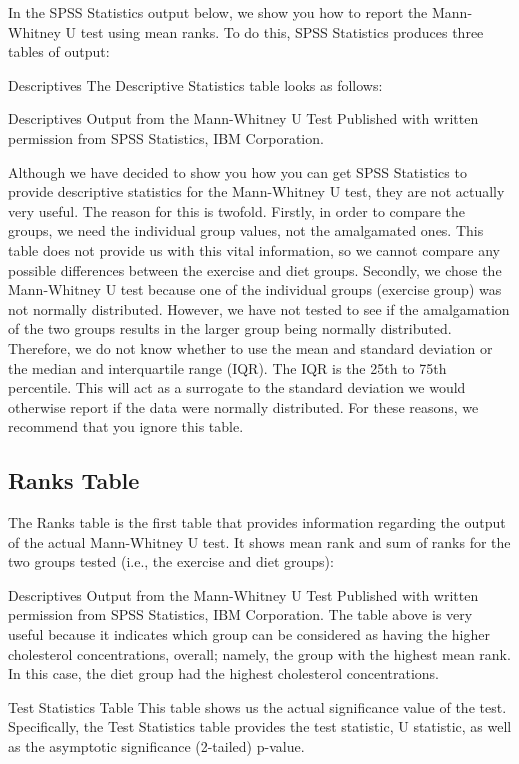 \documentclass[]{article}
\begin{document}
In the SPSS Statistics output below, we show you how to report the Mann-Whitney U test using mean ranks. To do this, SPSS Statistics produces three tables of output:

Descriptives
The Descriptive Statistics table looks as follows:

Descriptives Output from the Mann-Whitney U Test
Published with written permission from SPSS Statistics, IBM Corporation.

Although we have decided to show you how you can get SPSS Statistics to provide descriptive statistics for the Mann-Whitney U test, they are not actually very useful. The reason for this is twofold. Firstly, in order to compare the groups, we need the individual group values, not the amalgamated ones. This table does not provide us with this vital information, so we cannot compare any possible differences between the exercise and diet groups. Secondly, we chose the Mann-Whitney U test because one of the individual groups (exercise group) was not normally distributed. However, we have not tested to see if the amalgamation of the two groups results in the larger group being normally distributed. Therefore, we do not know whether to use the mean and standard deviation or the median and interquartile range (IQR). The IQR is the 25th to 75th percentile. This will act as a surrogate to the standard deviation we would otherwise report if the data were normally distributed. For these reasons, we recommend that you ignore this table.

\subsection{Ranks Table}
The Ranks table is the first table that provides information regarding the output of the actual Mann-Whitney U test. It shows mean rank and sum of ranks for the two groups tested (i.e., the exercise and diet groups):

Descriptives Output from the Mann-Whitney U Test
Published with written permission from SPSS Statistics, IBM Corporation.
The table above is very useful because it indicates which group can be considered as having the higher cholesterol concentrations, overall; namely, the group with the highest mean rank. In this case, the diet group had the highest cholesterol concentrations.

Test Statistics Table
This table shows us the actual significance value of the test. Specifically, the Test Statistics table provides the test statistic, U statistic, as well as the asymptotic significance (2-tailed) p-value.
\end{document}
